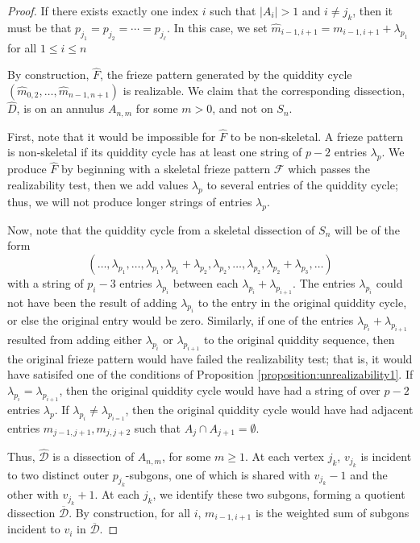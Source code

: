 \documentclass[12pt]{article}
\theoremstyle{remark}
\newcommand*{\D}{\mathcal{D}}
\begin{document}
\begin{proof}
If there exists exactly one index $i$ such that $\vert A_i \vert > 1$ and $i \neq j_k$,  then it must be that $p_{j_1} = p_{j_2} = \cdots = p_{j_\ell}$. In this case, we set $\widehat{m}_{i-1,i+1} = m_{i-1,i+1} + \lambda_{p_1}$ for all $1 \leq i \leq n$ 

By construction, $\widehat{F}$, the frieze pattern generated by the quiddity cycle $(\widehat{m}_{0,2},\ldots,\widehat{m}_{n-1,n+1})$ is realizable. We claim that the corresponding dissection, $\widehat{D}$, is on an annulus $A_{n,m}$ for some $m > 0$, and not on $S_n$. 

First, note that it would be impossible for $\widehat{F}$ to be non-skeletal. A frieze pattern is non-skeletal if its quiddity cycle has at least one string of $p-2$ entries $\lambda_p$. We produce $\widehat{F}$ by beginning with a skeletal frieze pattern $\mathcal{F}$ which passes the realizability test, then we add values $\lambda_p$ to several entries of the quiddity cycle; thus, we will not produce longer strings of entries $\lambda_p$.  

Now, note that the quiddity cycle from a skeletal dissection of $S_n$ will be of the form \begin{equation}\label{eq:punctureddiscquid}
(\ldots,\lambda_{p_1},\ldots, \lambda_{p_1},\lambda_{p_1} +\lambda_{p_2}, \lambda_{p_2},\ldots,\lambda_{p_2},\lambda_{p_2}+\lambda_{p_3},\ldots) \end{equation} with a string of $p_i-3$ entries $\lambda_{p_i}$ between each $\lambda_{p_i} + \lambda_{p_{i+1}}$. The entries $\lambda_{p_i}$ could not have been the result of adding $\lambda_{p_i}$ to the entry in the original quiddity cycle, or else the original entry would be zero. Similarly, if one of the entries $\lambda_{p_i} + \lambda_{p_{i+1}}$ resulted from adding either $\lambda_{p_i}$ or $\lambda_{p_{i+1}}$ to the original quiddity sequence, then the original frieze pattern would have failed the realizability test; that is, it would have satisifed one of the conditions of Proposition \ref{proposition:unrealizability1}. If $\lambda_{p_i} = \lambda_{p_{i+1}}$, then the original quiddity cycle would have had a string of over $p-2$ entries $\lambda_p$. If $\lambda_{p_i} \neq \lambda_{p_{i=1}}$, then the original quiddity cycle would have had adjacent entries $m_{j-1,j+1},m_{j,j+2}$ such that $A_j \cap A_{j+1} = \emptyset$. 

Thus, $\widehat{\D}$ is a dissection of $A_{n,m}$, for some $m \geq 1$. At each vertex $j_k$, $v_{j_k}$ is incident to two distinct outer $p_{j_k}$-subgons, one of which is shared with $v_{j_k}-1$ and the other with $v_{j_k}+1$. At each $j_k$, we identify these two subgons, forming a quotient dissection $\overline{\D}$. By construction, for all $i$, $m_{i-1,i+1}$ is the weighted sum of subgons incident to $v_i$ in $\overline{\D}$.
\end{proof}
\end{document}
